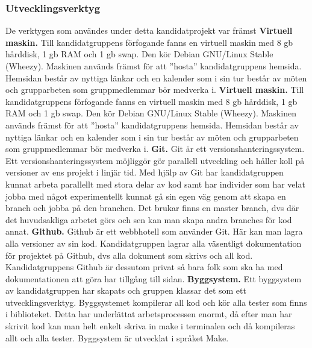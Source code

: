 \subsubsection{Utvecklingsverktyg}
De verktygen som användes under detta kandidatprojekt var främst
\newline
\newline
\textbf{Virtuell maskin.} Till kandidatgruppens förfogande fanns en virtuell maskin med 8 gb hårddisk, 1 gb RAM och 1 gb swap. Den kör Debian GNU/Linux Stable (Wheezy). Maskinen används främst för att ''hosta'' kandidatgruppens hemsida. Hemsidan består av nyttiga länkar och en kalender som i sin tur består av möten och grupparbeten som gruppmedlemmar bör medverka i.
\newline
\newline 
\textbf{Virtuell maskin.} Till kandidatgruppens förfogande fanns en virtuell maskin med 8 gb hårddisk, 1 gb RAM och 1 gb swap. Den kör Debian GNU/Linux Stable (Wheezy). Maskinen används främst för att ''hosta'' kandidatgruppens hemsida. Hemsidan består av nyttiga länkar och en kalender som i sin tur består av möten och grupparbeten som gruppmedlemmar bör medverka i.
\newline
\newline 
\textbf{Git.} Git är ett versionshanteringssystem. Ett versionshanteringssystem möjliggör gör parallell utveckling och håller koll på versioner av ens projekt i linjär tid. Med hjälp av Git har kandidatgruppen kunnat arbeta parallellt med stora delar av kod samt har individer som har velat jobba med något experimentellt kunnat gå sin egen väg genom att skapa en branch och jobba på den branchen. Det brukar finns en master branch, dvs där det huvudsakliga arbetet görs och sen kan man skapa andra branches för kod annat. 
\newline
\newline 
\textbf{Github.} Github är ett webbhotell som använder Git. Här kan man lagra alla versioner av sin kod. Kandidatgruppen lagrar alla väsentligt dokumentation för projektet på Github, dvs alla dokument som skrivs och all kod. Kandidatgruppens Github är dessutom privat så bara folk som ska ha med dokumentationen att göra har tillgång till sidan.
\newline
\newline
\textbf{Byggsystem.} Ett byggsystem av kandidatgruppen har skapats och gruppen klassar det som ett utvecklingsverktyg. Byggsystemet kompilerar all kod och kör alla tester som finns i biblioteket. Detta har underlättat arbetsprocessen enormt, då efter man har skrivit kod kan man helt enkelt skriva in make i terminalen och då kompileras allt och alla tester. Byggsystem är utvecklat i språket Make.
